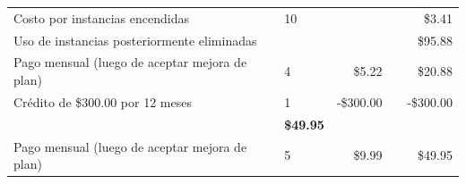 \begin{table}[h!]
\begin{tabular}{llrrr}
		Costo por instancias encendidas                                                  & 10                                                                                   &                                                                                             &                                                                                   & \$3.41                                                                               \\
		Uso de instancias posteriormente eliminadas                                      &                                                                                      &                                                                                             &                                                                                   & \$95.88                                                                              \\
		Pago mensual (luego de aceptar mejora de plan)                                   & 4                                                                                    & \$5.22                                                                                      &                                                                                   & \$20.88                                                                              \\
		Crédito de \$300.00 por 12 meses                                                 & 1                                                                                    & -\$300.00                                                                                   &                                                                                   & -\$300.00                                                                            \\
		\rowcolor[HTML]{DAE8FC} 
		\multicolumn{4}{l}{\cellcolor[HTML]{DAE8FC}\textbf{Google Colab Pro}}                                                                                                                                                                                                                                                                                     & \textbf{\$49.95}                                                                     \\
		Pago mensual (luego de aceptar mejora de plan)                                   & 5                                                                                    & \$9.99                                                                                      & \multicolumn{1}{l}{}                                                              & \$49.95                                                                              \\

\end{tabular}
\end{table}
